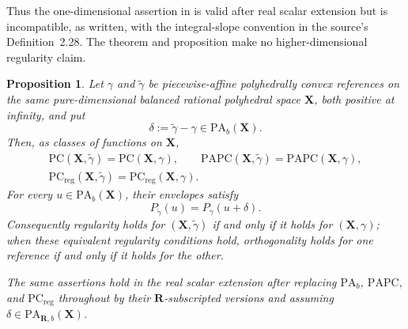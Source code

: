 \documentclass[11pt,a4paper]{article}
\newtheorem{proposition}[proposition]{Proposition}
\theoremstyle{definition}
\theoremstyle{remark}
\begin{document}
Thus the one-dimensional assertion in
\cite[Proposition~6.13]{BMPS26} is valid after real scalar extension but is
incompatible, as written, with the integral-slope convention in the source's
Definition~2.28.  The theorem and proposition make no higher-dimensional
regularity claim.








\begin{proposition}\label{prop:frontier-polyhedral-bounded-reference-shift}
Let \(\gamma\) and \(\widetilde\gamma\) be piecewise-affine
polyhedrally convex references on the same pure-dimensional balanced
rational polyhedral space \(\mathbf X\), both positive at infinity, and put
\[
             \delta:=\widetilde\gamma-\gamma\in
             \mathrm{PA}_{b}(\mathbf X).
\]
Then, as classes of functions on \(\mathbf X\),
\[
\begin{gathered}
 \mathrm{PC}(\mathbf X,\widetilde\gamma)
 =\mathrm{PC}(\mathbf X,\gamma),\qquad
 \mathrm{PAPC}(\mathbf X,\widetilde\gamma)
 =\mathrm{PAPC}(\mathbf X,\gamma),\\
 \mathrm{PC}_{\mathrm{reg}}(\mathbf X,\widetilde\gamma)
 =\mathrm{PC}_{\mathrm{reg}}(\mathbf X,\gamma).
\end{gathered}
\]
For every \(u\in\mathrm{PA}_{b}(\mathbf X)\), their envelopes satisfy
\[
 P_{\widetilde\gamma}(u)=P_\gamma(u+\delta).
 \tag{\(\star\)}\label{eq:frontier-polyhedral-bounded-shift-envelope}
\]
Consequently regularity holds for \((\mathbf X,\widetilde\gamma)\) if and
only if it holds for \((\mathbf X,\gamma)\); when these equivalent
regularity conditions hold, orthogonality holds for one reference if and
only if it holds for the other.

The same assertions hold in the real scalar extension after replacing
\(\mathrm{PA}_{b}\), \(\mathrm{PAPC}\), and
\(\mathrm{PC}_{\mathrm{reg}}\) throughout by their
\(\mathbf R\)-subscripted versions and assuming
\(\delta\in\mathrm{PA}_{\mathbf R,b}(\mathbf X)\).
\end{proposition}
\end{document}
